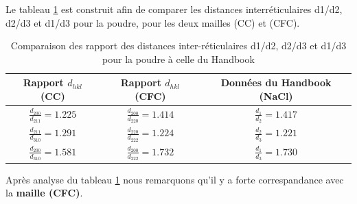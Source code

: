 \begin{flushleft}
Le tableau \ref{tab:Comparaison des rapport des distances inter-réticulaires d1/d2, d2/d3 et d1/d3 pour la poudre à celle du Handbook} est construit afin de comparer les distances interréticulaires
	d1/d2, d2/d3 et d1/d3 pour la poudre, pour les deux mailles (CC) et (CFC).

\begin{table}[h!]
	\centering
	\begin{tabular}{|c|c|c|}
		\hline
		 Rapport $d_{hkl}$ (CC)  &  Rapport $d_{hkl}$ (CFC) &  Données du Handbook (NaCl)\\
		\hline
		 $\frac{d_{200}}{d_{211}} = 1.225 $ & $\frac{d_{200}}{d_{220}} = 1.414 $  & $\frac{d_{1}}{d_{2}} = 1.417 $  \\
		\hline
		 $\frac{d_{211}}{d_{310}} = 1.291 $ & $\frac{d_{220}}{d_{222}} = 1.224 $  & $\frac{d_{2}}{d_{3}} = 1.221 $  \\
		\hline
		 $\frac{d_{200}}{d_{310}} = 1.581 $ & $\frac{d_{200}}{d_{222}} = 1.732 $  & $\frac{d_{1}}{d_{3}} = 1.730 $ \\
		\hline
	\end{tabular}
	\caption{\centering Comparaison des rapport des distances inter-réticulaires d1/d2, d2/d3 et d1/d3 pour la poudre à celle du Handbook}
	\label{tab:Comparaison des rapport des distances inter-réticulaires d1/d2, d2/d3 et d1/d3 pour la poudre à celle du Handbook}
\end{table}




	Après analyse du tableau \ref{tab:Comparaison des rapport des distances inter-réticulaires d1/d2, d2/d3 et d1/d3 pour la poudre à celle du Handbook}  nous remarquons qu'il y a forte correspandance avec la \textbf{maille (CFC)}. 
	
	

\end{flushleft}


